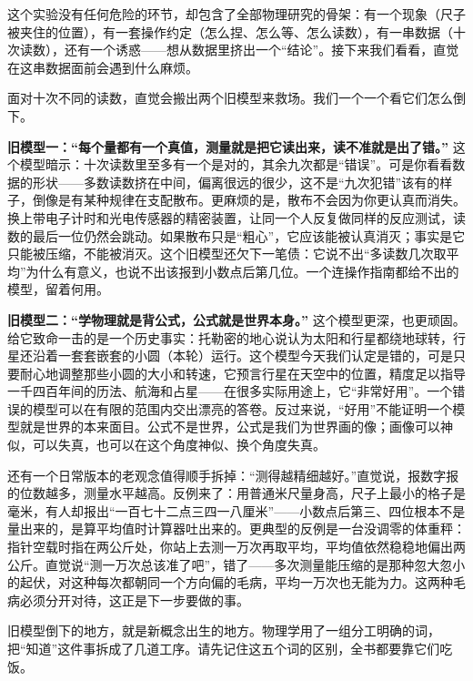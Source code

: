 这个实验没有任何危险的环节，却包含了全部物理研究的骨架：有一个现象（尺子被夹住的位置），有一套操作约定（怎么捏、怎么等、怎么读数），有一串数据（十次读数），还有一个诱惑——想从数据里挤出一个“结论”。接下来我们看看，直觉在这串数据面前会遇到什么麻烦。


面对十次不同的读数，直觉会搬出两个旧模型来救场。我们一个一个看它们怎么倒下。

\textbf{旧模型一：“每个量都有一个真值，测量就是把它读出来，读不准就是出了错。”} 这个模型暗示：十次读数里至多有一个是对的，其余九次都是“错误”。可是你看看数据的形状——多数读数挤在中间，偏离很远的很少，这不是“九次犯错”该有的样子，倒像是有某种规律在支配散布。更麻烦的是，散布不会因为你更认真而消失。换上带电子计时和光电传感器的精密装置，让同一个人反复做同样的反应测试，读数的最后一位仍然会跳动。如果散布只是“粗心”，它应该能被认真消灭；事实是它只能被压缩，不能被消灭。这个旧模型还欠下一笔债：它说不出“多读数几次取平均”为什么有意义，也说不出该报到小数点后第几位。一个连操作指南都给不出的模型，留着何用。

\textbf{旧模型二：“学物理就是背公式，公式就是世界本身。”} 这个模型更深，也更顽固。给它致命一击的是一个历史事实：托勒密的地心说认为太阳和行星都绕地球转，行星还沿着一套套嵌套的小圆（本轮）运行。这个模型今天我们认定是错的，可是只要耐心地调整那些小圆的大小和转速，它预言行星在天空中的位置，精度足以指导一千四百年间的历法、航海和占星——在很多实际用途上，它“非常好用”。一个错误的模型可以在有限的范围内交出漂亮的答卷。反过来说，“好用”不能证明一个模型就是世界的本来面目。公式不是世界，公式是我们为世界画的像；画像可以神似，可以失真，也可以在这个角度神似、换个角度失真。

还有一个日常版本的老观念值得顺手拆掉：“测得越精细越好。”直觉说，报数字报的位数越多，测量水平越高。反例来了：用普通米尺量身高，尺子上最小的格子是毫米，有人却报出“一百七十二点三四一八厘米”——小数点后第三、四位根本不是量出来的，是算平均值时计算器吐出来的。更典型的反例是一台没调零的体重秤：指针空载时指在两公斤处，你站上去测一万次再取平均，平均值依然稳稳地偏出两公斤。直觉说“测一万次总该准了吧”，错了——多次测量能压缩的是那种忽大忽小的起伏，对这种每次都朝同一个方向偏的毛病，平均一万次也无能为力。这两种毛病必须分开对待，这正是下一步要做的事。


旧模型倒下的地方，就是新概念出生的地方。物理学用了一组分工明确的词，把“知道”这件事拆成了几道工序。请先记住这五个词的区别，全书都要靠它们吃饭。

